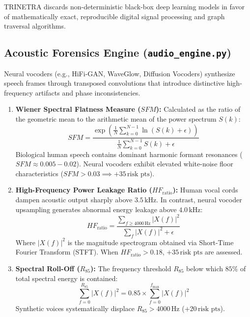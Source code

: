 \documentclass[11pt,a4paper]{article}
\begin{document}
TRINETRA discards non-deterministic black-box deep learning models in favor of mathematically exact, reproducible digital signal processing and graph traversal algorithms.

\subsection{Acoustic Forensics Engine (\texttt{audio\_engine.py})}
Neural vocoders (e.g., HiFi-GAN, WaveGlow, Diffusion Vocoders) synthesize speech frames through transposed convolutions that introduce distinctive high-frequency artifacts and phase inconsistencies.
\begin{enumerate}[leftmargin=1.8em, itemsep=3pt]
    \item \textbf{Wiener Spectral Flatness Measure ($SFM$):}
    Calculated as the ratio of the geometric mean to the arithmetic mean of the power spectrum $S(k)$:
    \begin{equation}
        SFM = \frac{\exp\left(\frac{1}{N}\sum_{k=0}^{N-1} \ln(S(k) + \epsilon)\right)}{\frac{1}{N}\sum_{k=0}^{N-1} S(k) + \epsilon}
    \end{equation}
    Biological human speech contains dominant harmonic formant resonances ($SFM \approx 0.005 - 0.02$). Neural vocoders exhibit elevated white-noise floor characteristics ($SFM > 0.03 \implies +35\,\text{risk pts}$).

    \item \textbf{High-Frequency Power Leakage Ratio ($HF_{\text{ratio}}$):}
    Human vocal cords dampen acoustic output sharply above $3.5\,\text{kHz}$. In contrast, neural vocoder upsampling generates abnormal energy leakage above $4.0\,\text{kHz}$:
    \begin{equation}
        HF_{\text{ratio}} = \frac{\sum_{f \ge 4000\,\text{Hz}} |X(f)|^2}{\sum_{f} |X(f)|^2 + \epsilon}
    \end{equation}
    Where $|X(f)|^2$ is the magnitude spectrogram obtained via Short-Time Fourier Transform (STFT). When $HF_{\text{ratio}} > 0.18$, $+35\,\text{risk pts}$ are assessed.

    \item \textbf{Spectral Roll-Off ($R_{85}$):}
    The frequency threshold $R_{85}$ below which $85\%$ of total spectral energy is contained:
    \begin{equation}
        \sum_{f = 0}^{R_{85}} |X(f)|^2 = 0.85 \times \sum_{f = 0}^{f_{\max}} |X(f)|^2
    \end{equation}
    Synthetic voices systematically displace $R_{85} > 4000\,\text{Hz}$ ($+20\,\text{risk pts}$).
\end{enumerate}
\end{document}
